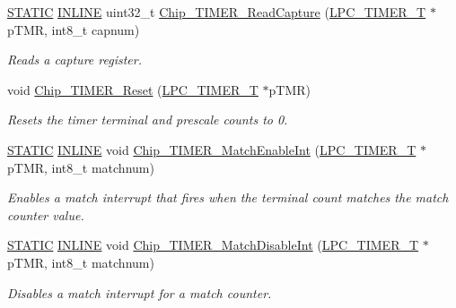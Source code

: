 \begin{DoxyCompactItemize}
\hyperlink{group___l_p_c___types___public___macros_ga10b2d890d871e1489bb02b7e70d9bdfb}{S\+T\+A\+T\+IC} \hyperlink{spifi__18xx__43xx_8h_a2eb6f9e0395b47b8d5e3eeae4fe0c116}{I\+N\+L\+I\+NE} uint32\+\_\+t \hyperlink{group___t_i_m_e_r__18_x_x__43_x_x_ga7eab047dd60eef7fb0f042266f9dae05}{Chip\+\_\+\+T\+I\+M\+E\+R\+\_\+\+Read\+Capture} (\hyperlink{struct_l_p_c___t_i_m_e_r___t}{L\+P\+C\+\_\+\+T\+I\+M\+E\+R\+\_\+T} $\ast$p\+T\+MR, int8\+\_\+t capnum)
\begin{DoxyCompactList}\small\item\em Reads a capture register. \end{DoxyCompactList}\item 
void \hyperlink{group___t_i_m_e_r__18_x_x__43_x_x_gaba0336e88cc662505e2dde1eabff1aaf}{Chip\+\_\+\+T\+I\+M\+E\+R\+\_\+\+Reset} (\hyperlink{struct_l_p_c___t_i_m_e_r___t}{L\+P\+C\+\_\+\+T\+I\+M\+E\+R\+\_\+T} $\ast$p\+T\+MR)
\begin{DoxyCompactList}\small\item\em Resets the timer terminal and prescale counts to 0. \end{DoxyCompactList}\item 
\hyperlink{group___l_p_c___types___public___macros_ga10b2d890d871e1489bb02b7e70d9bdfb}{S\+T\+A\+T\+IC} \hyperlink{spifi__18xx__43xx_8h_a2eb6f9e0395b47b8d5e3eeae4fe0c116}{I\+N\+L\+I\+NE} void \hyperlink{group___t_i_m_e_r__18_x_x__43_x_x_ga21daeb9b42a0f7fe57ec52f3815ab223}{Chip\+\_\+\+T\+I\+M\+E\+R\+\_\+\+Match\+Enable\+Int} (\hyperlink{struct_l_p_c___t_i_m_e_r___t}{L\+P\+C\+\_\+\+T\+I\+M\+E\+R\+\_\+T} $\ast$p\+T\+MR, int8\+\_\+t matchnum)
\begin{DoxyCompactList}\small\item\em Enables a match interrupt that fires when the terminal count matches the match counter value. \end{DoxyCompactList}\item 
\hyperlink{group___l_p_c___types___public___macros_ga10b2d890d871e1489bb02b7e70d9bdfb}{S\+T\+A\+T\+IC} \hyperlink{spifi__18xx__43xx_8h_a2eb6f9e0395b47b8d5e3eeae4fe0c116}{I\+N\+L\+I\+NE} void \hyperlink{group___t_i_m_e_r__18_x_x__43_x_x_ga81252a6e24fddbf78d62f791f589306e}{Chip\+\_\+\+T\+I\+M\+E\+R\+\_\+\+Match\+Disable\+Int} (\hyperlink{struct_l_p_c___t_i_m_e_r___t}{L\+P\+C\+\_\+\+T\+I\+M\+E\+R\+\_\+T} $\ast$p\+T\+MR, int8\+\_\+t matchnum)
\begin{DoxyCompactList}\small\item\em Disables a match interrupt for a match counter. \end{DoxyCompactList}\item 

\end{DoxyCompactItemize}
